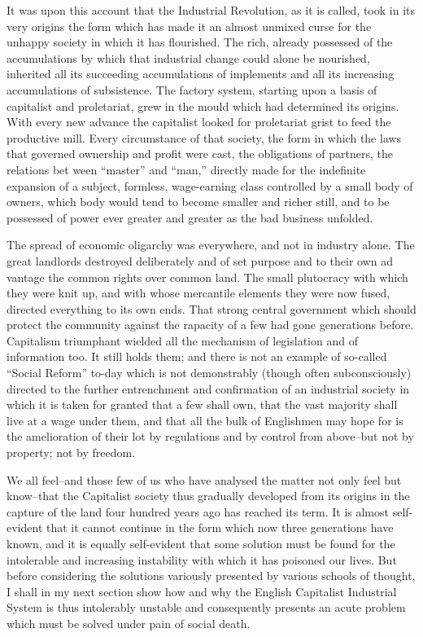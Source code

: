 \documentclass{book}
\begin{document}
It was upon this account that the Industrial Revolution, as it is called, took in its very origins the form which has made it an almost unmixed curse for the unhappy society in which it has flourished. The rich, already possessed of the accumulations by which that industrial change could alone be nourished, inherited all its succeeding accumulations of implements and all its increasing accumulations of subsistence. The factory system, starting upon a basis of capitalist and proletariat, grew in the mould which had determined its origins. With every new advance the capitalist looked for proletariat grist to feed the productive mill. Every circumstance of that society, the form in which the laws that governed ownership and profit were cast, the obligations of partners, the relations bet ween “master” and “man,” directly made for the indefinite expansion of a subject, formless, wage-earning class controlled by a small body of owners, which body would tend to become smaller and richer still, and to be possessed of power ever greater and greater as the bad business unfolded.

The spread of economic oligarchy was everywhere, and not in industry alone. The great landlords destroyed deliberately and of set purpose and to their own ad vantage the common rights over common land. The small plutocracy with which they were knit up, and with whose mercantile elements they were now fused, directed everything to its own ends. That strong central government which should protect the community against the rapacity of a few had gone generations before. Capitalism triumphant wielded all the mechanism of legislation and of information too. It still holds them; and there is not an example of so-called “Social Reform” to-day which is not demonstrably (though often subconsciously) directed to the further entrenchment and confirmation of an industrial society in which it is taken for granted that a few shall own, that the vast majority shall live at a wage under them, and that all the bulk of Englishmen may hope for is the amelioration of their lot by regulations and by control from above–but not by property; not by freedom.

We all feel–and those few of us who have analysed the matter not only feel but know–that the Capitalist society thus gradually developed from its origins in the capture of the land four hundred years ago has reached its term. It is almost self-evident that it cannot continue in the form which now three generations have known, and it is equally self-evident that some solution must be found for the intolerable and increasing instability with which it has poisoned our lives. But before considering the solutions variously presented by various schools of thought, I shall in my next section show how and why the English Capitalist Industrial System is thus intolerably unstable and consequently presents an acute problem which must be solved under pain of social death.
\end{document}
